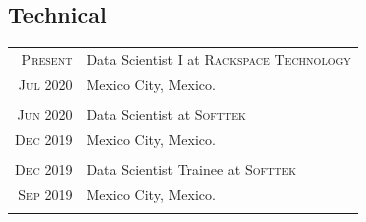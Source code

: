 \documentclass[a4paper,10pt]{article} %
\begin{document}
\subsection*{Technical}
\vspace{0.2cm}
\begin{tabular}{r|p{11cm}}

	\textsc{Present}& Data Scientist I at \textsc{Rackspace Technology}\\
	\textsc{Jul 2020}& \small Mexico City, Mexico.\\
	\multicolumn{2}{c}{} \\
	
	
	\textsc{Jun 2020}& Data Scientist at \textsc{Softtek}\\
	\textsc{Dec 2019}& \small Mexico City, Mexico.\\
	\multicolumn{2}{c}{} \\
	
	
	\textsc{Dec 2019}& Data Scientist Trainee at \textsc{Softtek}\\
	\textsc{Sep 2019}& \small Mexico City, Mexico.\\
	\multicolumn{2}{c}{} \\
	
	
\end{tabular}
\end{document}

